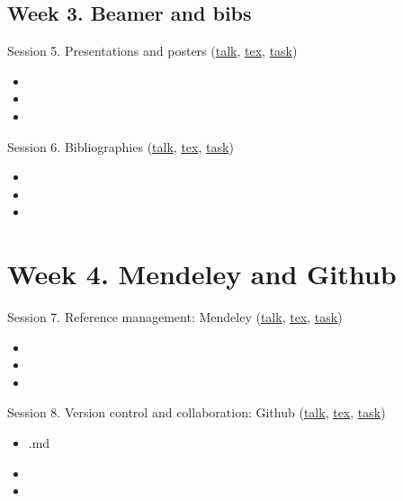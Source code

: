 \documentclass[a4paper,12pt]{article} %
\begin{document}
\vfill

\subsection*{Week 3. Beamer and bibs}
	Session 5. Presentations and posters (\href{}{talk}, \href{}{tex}, \href{}{task})
	\begin{itemize}
		\item 
		\item
		\item
	\end{itemize}
	Session 6. Bibliographies (\href{}{talk}, \href{}{tex}, \href{}{task})
	\begin{itemize}
		\item 
		\item
		\item
	\end{itemize}	


\section{{\color{red}Week 4. Mendeley and Github}}
	Session 7. Reference management: Mendeley (\href{}{talk}, \href{}{tex}, \href{}{task})
	
	\begin{itemize}
		\item 
		\item
		\item
	\end{itemize}%
 Session 8. Version control and collaboration: Github (\href{}{talk}, \href{}{tex}, \href{}{task})
	\begin{itemize}
		\item .md
		\item 
		\item
	\end{itemize}
\end{document}
